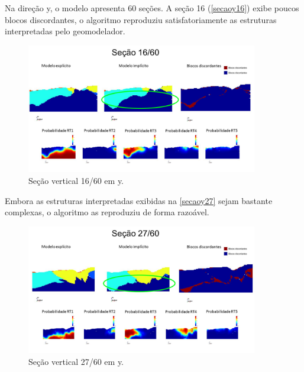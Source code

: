 Na direção y, o modelo apresenta 60 seções. A seção 16 (\autoref{secaoy16}) exibe poucos blocos discordantes, o algoritmo reproduziu satisfatoriamente as estruturas interpretadas pelo geomodelador.

\begin{figure}[H]
	\caption{\label{secaoy16}Seção vertical 16/60 em y.}
	\begin{center}
		\includegraphics[width=0.9\textwidth]{estudo_de_caso/secaoy16}
	\end{center}
\end{figure}

Embora as estruturas interpretadas exibidas na \autoref{secaoy27} sejam bastante complexas, o algoritmo as reproduziu de forma razoável. 

\begin{figure}[H]
	\caption{\label{secaoy27}Seção vertical 27/60 em y.}
	\begin{center}
		\includegraphics[width=0.9\textwidth]{estudo_de_caso/secaoy27}
	\end{center}
\end{figure}

